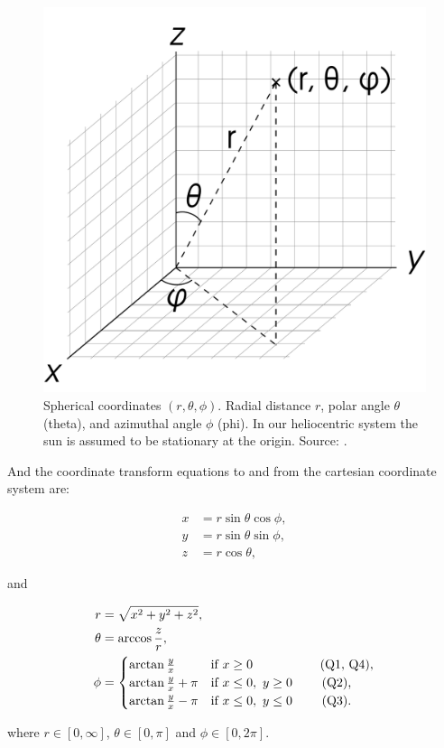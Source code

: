 \begin{figure}[ht]
    \centering
    \includegraphics[width=0.50\linewidth]{fig/3D_Spherical}
    \caption{Spherical coordinates \((r, \theta, \phi)\). Radial distance \(r\), polar angle \(\theta\) (theta), and azimuthal angle \(\phi\) (phi). In our heliocentric system the sun is assumed to be stationary at the origin. Source: \cite{WikiSpherical}.}
    \label{fig:3D_Spherical}
\end{figure}

And the coordinate transform equations to and from the cartesian coordinate system are:

\begin{align}
    x &= r \sin{\theta}\cos{\phi}, \label{eq:x(q)} \\
    y &= r \sin{\theta}\sin{\phi}, \label{eq:y(q)}\\
    z &= r \cos{\theta}, \label{eq:z(q)}
\end{align}

and

\begin{align}
    r &= \sqrt{x^2 + y^2 + z^2}, \label{eq:r(x,y,z)}\\
    \theta &= \arccos{\frac{z}{r}}, \label{eq:theta(x,y,z)}\\
    \phi &= 
    \begin{cases}
    \arctan{\frac{y}{x}} & \text{if \(x \geq 0\) \qquad \qquad \ \ \ (Q1, Q4),}
    \\
    \arctan{\frac{y}{x}}+\pi & \text{if \(x \leq 0,\ y \geq 0\) \qquad (Q2),}
    \\
    \arctan{\frac{y}{x}}-\pi & \text{if \(x \leq 0,\ y \leq 0\) \qquad (Q3).}
    \end{cases} \label{eq:phi(x,y,z)}
\end{align}

where \(r \in [0, \infty]\), \(\theta \in [0, \pi]\) and \(\phi \in [0, 2\pi]\).


